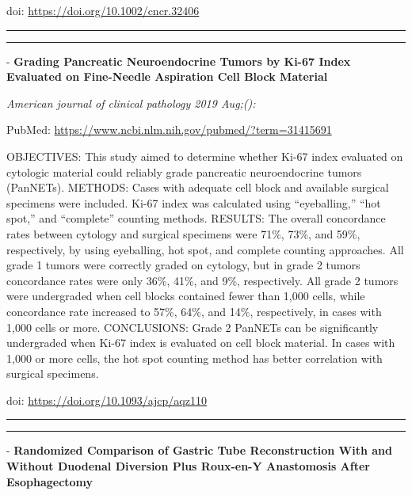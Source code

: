 \documentclass[]{article}
\begin{document}
doi: \url{https://doi.org/10.1002/cncr.32406}

{}

{}

\begin{center}\rule{0.5\linewidth}{\linethickness}\end{center}

\begin{center}\rule{0.5\linewidth}{\linethickness}\end{center}

 - \textbf{Grading Pancreatic Neuroendocrine Tumors by Ki-67 Index
Evaluated on Fine-Needle Aspiration Cell Block Material}

\emph{American journal of clinical pathology 2019 Aug;():}

PubMed: \url{https://www.ncbi.nlm.nih.gov/pubmed/?term=31415691}

OBJECTIVES: This study aimed to determine whether Ki-67 index evaluated
on cytologic material could reliably grade pancreatic neuroendocrine
tumors (PanNETs). METHODS: Cases with adequate cell block and available
surgical specimens were included. Ki-67 index was calculated using
``eyeballing,'' ``hot spot,'' and ``complete'' counting methods.
RESULTS: The overall concordance rates between cytology and surgical
specimens were 71\%, 73\%, and 59\%, respectively, by using eyeballing,
hot spot, and complete counting approaches. All grade 1 tumors were
correctly graded on cytology, but in grade 2 tumors concordance rates
were only 36\%, 41\%, and 9\%, respectively. All grade 2 tumors were
undergraded when cell blocks contained fewer than 1,000 cells, while
concordance rate increased to 57\%, 64\%, and 14\%, respectively, in
cases with 1,000 cells or more. CONCLUSIONS: Grade 2 PanNETs can be
significantly undergraded when Ki-67 index is evaluated on cell block
material. In cases with 1,000 or more cells, the hot spot counting
method has better correlation with surgical specimens.

doi: \url{https://doi.org/10.1093/ajcp/aqz110}

{}

{}

\begin{center}\rule{0.5\linewidth}{\linethickness}\end{center}

\begin{center}\rule{0.5\linewidth}{\linethickness}\end{center}

 - \textbf{Randomized Comparison of Gastric Tube Reconstruction With and
Without Duodenal Diversion Plus Roux-en-Y Anastomosis After
Esophagectomy}
\end{document}
